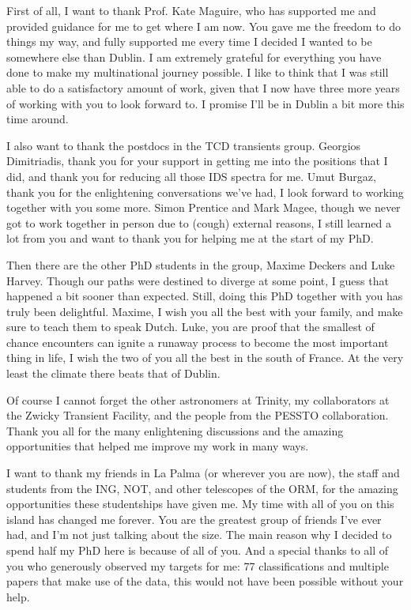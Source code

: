 
\begin{acknowledgements}
First of all, I want to thank Prof. Kate Maguire, who has supported me and provided guidance for me to get where I am now. You gave me the freedom to do things my way, and fully supported me every time I decided I wanted to be somewhere else than Dublin. I am extremely grateful for everything you have done to make my multinational journey possible. I like to think that I was still able to do a satisfactory amount of work, given that I now have three more years of working with you to look forward to. I promise I'll be in Dublin a bit more this time around.

I also want to thank the postdocs in the TCD transients group. Georgios Dimitriadis, thank you for your support in getting me into the positions that I did, and thank you for reducing all those IDS spectra for me. Umut Burgaz, thank you for the enlightening conversations we've had, I look forward to working together with you some more. Simon Prentice and Mark Magee, though we never got to work together in person due to (cough) external reasons, I still learned a lot from you and want to thank you for helping me at the start of my PhD.

Then there are the other PhD students in the group, Maxime Deckers and Luke Harvey. Though our paths were destined to diverge at some point, I guess that happened a bit sooner than expected. Still, doing this PhD together with you has truly been delightful. Maxime, I wish you all the best with your family, and make sure to teach them to speak Dutch. Luke, you are proof that the smallest of chance encounters can ignite a runaway process to become the most important thing in life, I wish the two of you all the best in the south of France. At the very least the climate there beats that of Dublin.

Of course I cannot forget the other astronomers at Trinity, my collaborators at the Zwicky Transient Facility, and the people from the PESSTO collaboration. Thank you all for the many enlightening discussions and the amazing opportunities that helped me improve my work in many ways.

I want to thank my friends in La Palma (or wherever you are now), the staff and students from the ING, NOT, and other telescopes of the ORM, for the amazing opportunities these studentships have given me. My time with all of you on this island has changed me forever. You are the greatest group of friends I've ever had, and I'm not just talking about the size. The main reason why I decided to spend half my PhD here is because of all of you. And a special thanks to all of you who generously observed my targets for me: 77 classifications and multiple papers that make use of the data, this would not have been possible without your help.


\end{acknowledgements}
